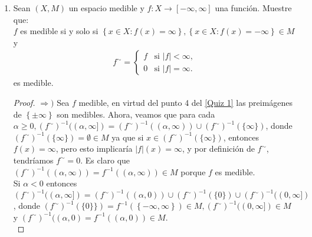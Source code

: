\documentclass[spanish,12pt,a4paper,openany]{book}
\begin{document}
\begin{enumerate}
\begin{itemize}
\begin{proof}
					Ahora note que la secuencia $\left\{\mathcal{A}_{k}\right\} = \left\{\cup_{m=k} ^{\infty} A_{m}\right\}$  es decreciente y $\mathcal{A}_{1} < \infty$, de modo que
					\begin{align*}
						\mu (\limsup A_{n}) &= \mu(\cap_{n=1} ^{\infty} (\cup_{m=k} ^{\infty} A_{m}))\\
											&= \mu (\cap_{n=1} ^{\infty} \mathcal{A}_{n})\\
											&=\lim_{n \rightarrow \infty } \mu (\mathcal{A}_{n})\\
											&= \lim_{n \rightarrow \infty } \mu (\cup_{k=n}^{\infty} A_{k})\\
											&= \limsup \mu (\cup_{k=n}^{\infty} A_{k})\\
											&\geq \limsup \mu (A_{n})
					\end{align*}
				\end{proof}
			\end{itemize}
		\item Sean $(X, M)$ un espacio medible y $f: X \rightarrow [-\infty , \infty]$ una función. Muestre que:\\
		
		$f$ es medible si y solo si $\left\{x \in X : f(x) = \infty \right\} , \left\{x \in X : f (x) = - \infty \right\} \in M$  y 
		\begin{align*}
			f^{\sim}= \begin{cases}
					f  &  \text{si } |f| < \infty, \\
					0  &  \text{si } |f| = \infty.
			\end{cases}
		\end{align*}
		es medible.\\
		\begin{proof}
			$\Rightarrow )$ Sea $f$ medible, en virtud del punto 4 del \ref{Quiz 1} las preimágenes de $\left\{\pm \infty \right\}$ son medibles. Ahora, veamos que para cada $\alpha \geq 0, (f^{\sim}) ^{-1} ((\alpha , \infty]) = (f^{\sim}) ^{-1} ((\alpha , \infty)) \cup (f^{\sim}) ^{-1} (\{ \infty \})$, donde $(f^{\sim}) ^{-1} (\{ \infty \}) = \emptyset \in M$ ya que si $x \in (f^{\sim}) ^{-1} (\{ \infty \})$, entonces $f(x) = \infty$, pero esto implicaría $|f|(x) = \infty$, y por definición de $f^{\sim}$, tendríamos $f^{\sim} = 0$. Es claro que $(f^{\sim}) ^{-1} ((\alpha, \infty )) = f^{-1}((\alpha, \infty)) \in M$ porque $f$ es medible.\\
			
			Si $\alpha < 0$ entonces $(f^{\sim}) ^{-1} ((\alpha , \infty]) = (f^{\sim}) ^{-1} ((\alpha , 0)) \cup (f^{\sim}) ^{-1} ( \{ 0 \} ) \cup (f^{\sim}) ^{-1} ((0, \infty])$, donde $(f^{\sim}) ^{-1} ( \{ 0 \} \}) = f^{-1}(\left\{- \infty, \infty \right\}) \in M, (f^{\sim}) ^{-1} ((0, \infty]) \in M $ y $(f^{\sim}) ^{-1} ((\alpha, 0) = f^{-1} ((\alpha, 0)) \in M$.\\
			

\end{proof}
\end{enumerate}
\end{document}

